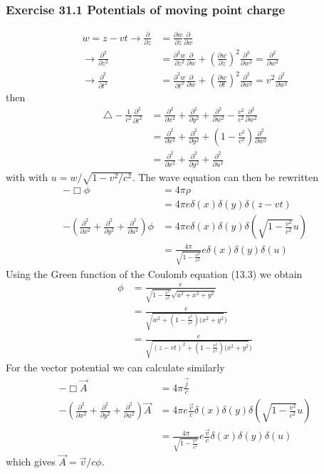 \documentclass[10pt,a4paper]{book}
\theoremstyle{definition}
\begin{document}
\subsubsection{Exercise 31.1 Potentials of moving point charge}
\begin{align}
    w=z-vt
    \rightarrow
    \frac{\partial}{\partial z}&=\frac{\partial w}{\partial z}\frac{\partial}{\partial w}\\
    \rightarrow\frac{\partial^2}{\partial z^2}&=\frac{\partial^2 w}{\partial z^2}\frac{\partial}{\partial w}+\left(\frac{\partial w}{\partial z}\right)^2\frac{\partial^2}{\partial w^2}=\frac{\partial^2}{\partial w^2}\\
    \rightarrow\frac{\partial^2}{\partial t^2}&=\frac{\partial^2 w}{\partial t^2}\frac{\partial}{\partial w}+\left(\frac{\partial w}{\partial t}\right)^2\frac{\partial^2}{\partial w^2}=v^2\frac{\partial^2}{\partial w^2}
\end{align}
then
\begin{align}
    \triangle-\frac{1}{c^2}\frac{\partial^2}{\partial t^2}&=\frac{\partial^2}{\partial x^2}+\frac{\partial^2}{\partial y^2}+\frac{\partial^2}{\partial w^2}-\frac{v^2}{c^2}\frac{\partial^2}{\partial w^2}\\
    &=\frac{\partial^2}{\partial x^2}+\frac{\partial^2}{\partial y^2}+\left(1-\frac{v^2}{c^2}\right)\frac{\partial^2}{\partial w^2}\\
    &=\frac{\partial^2}{\partial x^2}+\frac{\partial^2}{\partial y^2}+\frac{\partial^2}{\partial u^2}
\end{align}
with with $u=w/\sqrt{1-v^2/c^2}$. The wave equation can then be rewritten
\begin{align}
    -\Box\phi&=4\pi\rho\\
    &=4\pi e\delta(x)\delta(y)\delta(z-vt)\\
    -\left(\frac{\partial^2}{\partial x^2}+\frac{\partial^2}{\partial y^2}+\frac{\partial^2}{\partial u^2}\right)\phi&=4\pi e\delta(x)\delta(y)\delta\left(\sqrt{1-\frac{v^2}{c^2}}u\right)\\
    &=\frac{4\pi}{\sqrt{1-\frac{v^2}{c^2}}} e\delta(x)\delta(y)\delta\left(u\right)
\end{align}
Using the Green function of the Coulomb equation (13.3) we obtain
\begin{align}
    \phi&=\frac{e}{\sqrt{1-\frac{v^2}{c^2}}\sqrt{u^2+x^2+y^2}}\\
    &=\frac{e}{\sqrt{w^2+(1-\frac{v^2}{c^2})(x^2+y^2})}\\
    &=\frac{e}{\sqrt{(z-vt)^2+(1-\frac{v^2}{c^2})(x^2+y^2})}
\end{align}
For the vector potential we can calculate similarly
\begin{align}
    -\Box\vec{A}&=4\pi\frac{\vec{j}}{c}\\
    -\left(\frac{\partial^2}{\partial x^2}+\frac{\partial^2}{\partial y^2}+\frac{\partial^2}{\partial u^2}\right)\vec{A}&=4\pi e\frac{\vec{v}}{c}\delta(x)\delta(y)\delta\left(\sqrt{1-\frac{v^2}{c^2}}u\right)\\
    &=\frac{4\pi}{\sqrt{1-\frac{v^2}{c^2}}} e\frac{\vec{v}}{c}\delta(x)\delta(y)\delta\left(u\right)
\end{align}
which gives $\vec{A}=\vec{v}/c\phi$.
\end{document}
